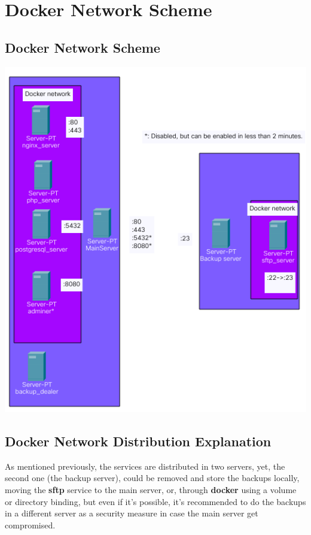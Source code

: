 \documentclass[11pt]{article}
\begin{document}
        \newpage

    \newpage
    \section{Docker Network Scheme}\label{sec:DockerNetworkScheme}
    \subsection{Docker Network Scheme}\label{subsec:ProjectNetworkScheme}
    \begin{center}
    \includegraphics[scale=1]{NetworkDistribution}
    \end{center}
    \newpage

    \subsection{Docker Network Distribution Explanation}\label{subsec:dockernetworkdistribution-explanation}
    \begin{flushleft}
        As mentioned previously, the services are distributed in two servers, yet, the second one (the backup server),
        could be removed and store the backups locally, moving the \textbf{sftp} service to the main server, or, through
        \textbf{docker} using a volume or directory binding, but even if it's possible, it's recommended to do the backups in a
        different server as a security measure in case the main server get compromised.
    \end{flushleft}
\end{document}
